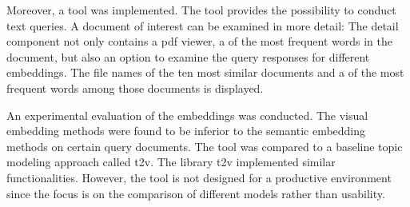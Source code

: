 Moreover, a tool was implemented.
The tool provides the possibility to conduct text queries.
A document of interest can be examined in more detail:
The detail component not only contains a \ac{pdf} viewer, 
a \wordcloud{} of the most frequent words in the document, but also an option to examine the query responses for different embeddings.
The file names of the ten most similar documents and a \wordcloud{} of the most frequent words among those documents is displayed.

An experimental evaluation of the embeddings was conducted.
The visual embedding methods were found to be inferior to the semantic embedding methods on certain query documents.
The tool was compared to a baseline topic modeling approach called \ac{t2v}.
The library \ac{t2v} implemented similar functionalities.
However, the tool is not designed for a productive environment since the focus is on the comparison of different models rather than usability.